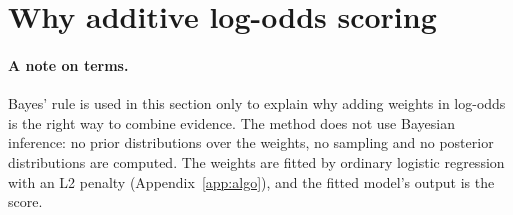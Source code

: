 \documentclass[10pt,letterpaper]{article}
\begin{document}
\section{Why additive log-odds scoring}\label{sec:bayes}

\paragraph{A note on terms.} Bayes' rule is used in this section only to explain why adding weights in log-odds is the right way to combine evidence. The method does not use Bayesian inference: no prior distributions over the weights, no sampling and no posterior distributions are computed. The weights are fitted by ordinary logistic regression with an L2 penalty (Appendix~\ref{app:algo}), and the fitted model's output is the score.
\end{document}
